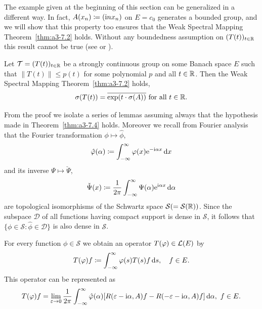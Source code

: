 The example given at the beginning of this section can be generalized in a different way.
In fact, $A(x_{n}) \coloneq (\mathrm{i} nx_{n})$ on $E = c_{0}$ generates a bounded group, and we will show that this property too ensures that the Weak Spectral Mapping Theorem~\ref{thm:a3-7.2} holds.
Without any boundedness assumption on $(T(t))_{t\in\mathbb{R}}$ this result cannot be true (see \textcite[Sec.~23.16]{hillephillips:1957} or \textcite{wolff:1981}).
\begin{theorem}\label{thm:a3-7.4}
Let $\mathcal{T} = (T(t))_{t\in\mathbb{R}}$ be a strongly continuous group on some Banach space $E$ such that $\|T(t)\| \leq p(t)$ for some polynomial $p$ and all $t \in \mathbb{R}$.
Then the Weak Spectral Mapping Theorem~\ref{thm:a3-7.2} holds, \ie 
\[
\sigma(T(t)) = \overline{\exp(t\cdot\sigma(A))} \text{ for all } t \in \mathbb{R} .
\]
\end{theorem}
From the proof we isolate a series of lemmas assuming always that the hypothesis made in Theorem~\ref{thm:a3-7.4} holds.
Moreover we recall from Fourier analysis that the Fourier transformation $\phi \mapsto \hat{\phi}$,
\[
\hat{\phi}(\alpha) \coloneq \int_{-\infty}^{\infty} \phi(x)\eu^{-\im\alpha x} \dx
\]
and its inverse $\Psi \mapsto \check{\Psi}$,
\[
\check{\Psi}(x) \coloneq \frac{1}{2\pi}\int_{-\infty}^{\infty}\Psi(\alpha)\mathrm{e}^{\mathrm{i}\alpha x} 		\mathop{}\!\mathrm{d}{\alpha}
\]
are topological isomorphisms of the Schwartz space $\mathcal{S} ( = \mathcal{S}(\mathbb{R}))$.
Since the subspace $\mathcal{D}$ of all functions having compact support is dense in $\mathcal{S}$, it follows that $\{\phi \in \mathcal{S} \colon \hat{\phi} \in \mathcal{D}\}$ is also dense in $\mathcal{S}$.
\begin{lemma}\label{lem:a3-7.5}
For every function $\phi \in \mathcal{S}$ we obtain an operator $T(\phi) \in \LE$ by
\[
T(\phi)f \coloneq \int_{-\infty}^{\infty} \phi(s)T(s)f \ds, \quad f \in E .
\]
This operator can be represented as
\begin{equation}\label{eq:a3-7.3}
T(\phi)f = \lim_{\epsilon\to 0} \frac{1}{2\pi}\int_{-\infty}^{\infty} \hat{\phi}(\alpha)[R(\epsilon-\im\alpha,A)f - R(-\epsilon-\im\alpha,A)f] \diff{\alpha}, \ f \in E .
\end{equation}
\end{lemma}
